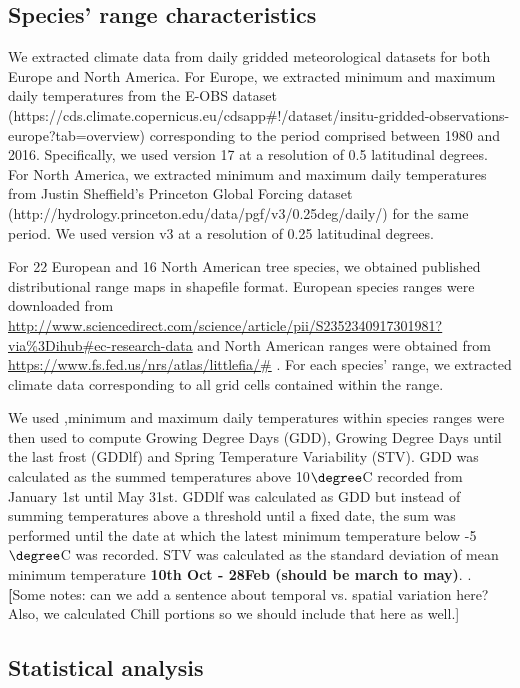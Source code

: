 \documentclass[12pt]{article}\usepackage[]{graphicx}\usepackage[]{color}
\begin{document}
\subsection*{Species' range characteristics}

We extracted climate data  from daily gridded meteorological datasets for both Europe and North America. For Europe, we extracted minimum and maximum daily temperatures from the E-OBS dataset (https://cds.climate.copernicus.eu/cdsapp#!/dataset/insitu-gridded-observations-europe?tab=overview) corresponding to the period comprised between 1980 and 2016. Specifically, we used version 17 at a resolution of 0.5 latitudinal degrees. For North America, we extracted minimum and maximum daily temperatures from Justin Sheffield’s Princeton Global Forcing dataset (http://hydrology.princeton.edu/data/pgf/v3/0.25deg/daily/) for the same period. We used version v3 at a resolution of 0.25 latitudinal degrees. 

For 22 European and 16 North American tree species, we obtained published distributional range maps in shapefile format. European species ranges were downloaded from \url{http://www.sciencedirect.com/science/article/pii/S2352340917301981?via\%3Dihub#ec-research-data} \citep{Caudullo2017} and North American ranges were obtained from \url{https://www.fs.fed.us/nrs/atlas/littlefia/#} \citep{Prasad2003}. For each species' range, we extracted climate data corresponding to all grid cells contained within the range.

We used ,minimum and maximum daily temperatures within species ranges were then used to compute Growing Degree Days (GDD), Growing Degree Days until the last frost (GDDlf) and Spring Temperature Variability (STV). GDD was calculated as the summed temperatures above 10$\degree$C recorded from January 1st until May 31st. GDDlf was calculated as GDD but instead of summing temperatures above a threshold until a fixed date, the sum was performed until the date at which the latest minimum temperature below -5$\degree$C was recorded. STV was calculated as the standard deviation of mean minimum temperature  \textbf{10th Oct - 28Feb (should be march to may)}. \citep{Zohner:2017aa}.  \textbf[Some notes: can we add a sentence about temporal vs. spatial variation here? Also, we calculated Chill portions so we should include that here as well.]

\subsection*{Statistical analysis}
\end{document}
